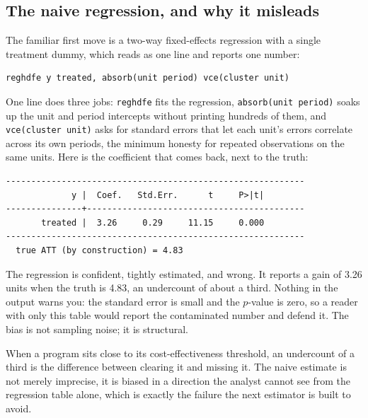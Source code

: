 \subsection{The naive regression, and why it misleads}
The familiar first move is a two-way fixed-effects regression with a single treatment dummy, which reads as one line and reports one number:
\par
{\footnotesize
\begin{verbatim}
reghdfe y treated, absorb(unit period) vce(cluster unit)
\end{verbatim}
}
One line does three jobs: \texttt{reghdfe} fits the regression, \texttt{absorb(unit period)} soaks up the unit and period intercepts without printing hundreds of them, and \texttt{vce(cluster unit)} asks for standard errors that let each unit's errors correlate across its own periods, the minimum honesty for repeated observations on the same units. Here is the coefficient that comes back, next to the truth:
\par
{\footnotesize
\begin{verbatim}
-----------------------------------------------------------
             y |  Coef.   Std.Err.      t     P>|t|
---------------+-------------------------------------------
       treated |  3.26     0.29     11.15     0.000
-----------------------------------------------------------
  true ATT (by construction) = 4.83
\end{verbatim}
}
The regression is confident, tightly estimated, and wrong. It reports a gain of 3.26 units when the truth is 4.83, an undercount of about a third. Nothing in the output warns you: the standard error is small and the $p$-value is zero, so a reader with only this table would report the contaminated number and defend it. The bias is not sampling noise; it is structural.

When a program sits close to its cost-effectiveness threshold, an undercount of a third is the difference between clearing it and missing it. The naive estimate is not merely imprecise, it is biased in a direction the analyst cannot see from the regression table alone, which is exactly the failure the next estimator is built to avoid.

